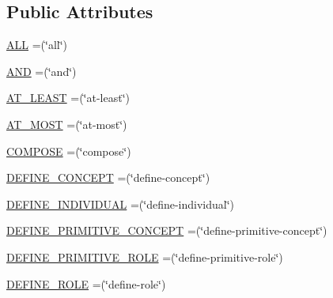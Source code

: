 \subsection*{Public Attributes}
\begin{DoxyCompactItemize}
\item 
\hyperlink{enumde_1_1uulm_1_1ecs_1_1ai_1_1owlapi_1_1krssrenderer_1_1_k_r_s_s2_vocabulary_a8bdc5c8825a006043d1e6511b647036c}{A\-L\-L} =(\char`\"{}all\char`\"{})
\item 
\hyperlink{enumde_1_1uulm_1_1ecs_1_1ai_1_1owlapi_1_1krssrenderer_1_1_k_r_s_s2_vocabulary_ae3a933c9247228f73f2e8da9537ae1bd}{A\-N\-D} =(\char`\"{}and\char`\"{})
\item 
\hyperlink{enumde_1_1uulm_1_1ecs_1_1ai_1_1owlapi_1_1krssrenderer_1_1_k_r_s_s2_vocabulary_a0e97e73314f88a3027617c284867c0f3}{A\-T\-\_\-\-L\-E\-A\-S\-T} =(\char`\"{}at-\/least\char`\"{})
\item 
\hyperlink{enumde_1_1uulm_1_1ecs_1_1ai_1_1owlapi_1_1krssrenderer_1_1_k_r_s_s2_vocabulary_a1a8fd0ee65dd9ad3012d4a5ccf22ced3}{A\-T\-\_\-\-M\-O\-S\-T} =(\char`\"{}at-\/most\char`\"{})
\item 
\hyperlink{enumde_1_1uulm_1_1ecs_1_1ai_1_1owlapi_1_1krssrenderer_1_1_k_r_s_s2_vocabulary_a38d6a99dadfa580bc945b86c635c141e}{C\-O\-M\-P\-O\-S\-E} =(\char`\"{}compose\char`\"{})
\item 
\hyperlink{enumde_1_1uulm_1_1ecs_1_1ai_1_1owlapi_1_1krssrenderer_1_1_k_r_s_s2_vocabulary_a804f5a16775c8ca83c0793d08af6196b}{D\-E\-F\-I\-N\-E\-\_\-\-C\-O\-N\-C\-E\-P\-T} =(\char`\"{}define-\/concept\char`\"{})
\item 
\hyperlink{enumde_1_1uulm_1_1ecs_1_1ai_1_1owlapi_1_1krssrenderer_1_1_k_r_s_s2_vocabulary_a556af70261da64e830e6eff7be1d86d2}{D\-E\-F\-I\-N\-E\-\_\-\-I\-N\-D\-I\-V\-I\-D\-U\-A\-L} =(\char`\"{}define-\/individual\char`\"{})
\item 
\hyperlink{enumde_1_1uulm_1_1ecs_1_1ai_1_1owlapi_1_1krssrenderer_1_1_k_r_s_s2_vocabulary_a2fa0ab77d96262e36e1e8a9ddd9f57b8}{D\-E\-F\-I\-N\-E\-\_\-\-P\-R\-I\-M\-I\-T\-I\-V\-E\-\_\-\-C\-O\-N\-C\-E\-P\-T} =(\char`\"{}define-\/primitive-\/concept\char`\"{})
\item 
\hyperlink{enumde_1_1uulm_1_1ecs_1_1ai_1_1owlapi_1_1krssrenderer_1_1_k_r_s_s2_vocabulary_a18ebc997a176cf16b904b211685fefbb}{D\-E\-F\-I\-N\-E\-\_\-\-P\-R\-I\-M\-I\-T\-I\-V\-E\-\_\-\-R\-O\-L\-E} =(\char`\"{}define-\/primitive-\/role\char`\"{})
\item 
\hyperlink{enumde_1_1uulm_1_1ecs_1_1ai_1_1owlapi_1_1krssrenderer_1_1_k_r_s_s2_vocabulary_a0b3a69a29caba036367178ce5b6bc6de}{D\-E\-F\-I\-N\-E\-\_\-\-R\-O\-L\-E} =(\char`\"{}define-\/role\char`\"{})

\end{DoxyCompactItemize}
